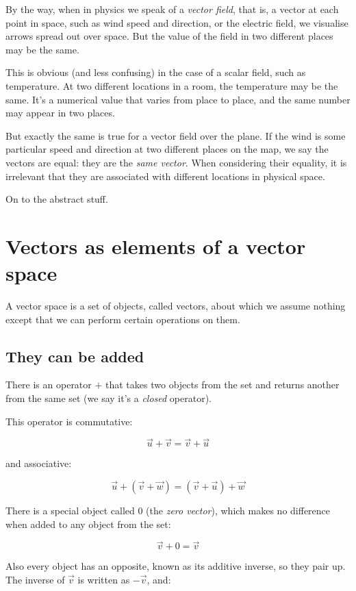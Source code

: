 By the way, when in physics we speak of a \textit{vector field}, that is, a vector at each point in space, such as wind speed and direction, or the electric field, we visualise arrows spread out over space. But the value of the field in two different places may be the same.

This is obvious (and less confusing) in the case of a scalar field, such as temperature. At two different locations in a room, the temperature may be the same. It's a numerical value that varies from place to place, and the same number may appear in two places.

But exactly the same is true for a vector field over the plane. If the wind is some particular speed and direction at two different places on the map, we say the vectors are equal: they are the \textit{same vector}. When considering their equality, it is irrelevant that they are associated with different locations in physical space.

On to the abstract stuff.

\section{Vectors as elements of a vector space}\label{sec:vectors-space}

A vector space is a set of objects, called vectors, about which we assume nothing except that we can perform certain operations on them.

\subsection{They can be added}

There is an operator $+$ that takes two objects from the set and returns another from the same set (we say it's a \textit{closed} operator).

This operator is commutative:

$$\vec{u} + \vec{v} = \vec{v} + \vec{u}$$

and associative:

$$\vec{u} + (\vec{v} + \vec{w}) = (\vec{v} + \vec{u}) + \vec{w}$$

There is a special object called $0$ (the \textit{zero vector}), which makes no difference when added to any object from the set:

$$\vec{v} + 0 = \vec{v}$$

Also every object has an opposite, known as its additive inverse, so they pair up. The inverse of $\vec{v}$ is written as $-\vec{v}$, and:

